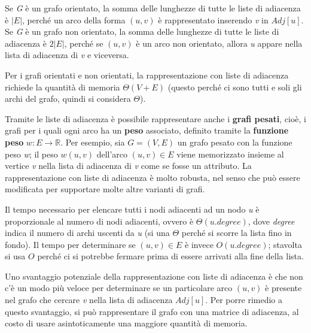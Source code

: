 \documentclass[10pt, a4paper]{report}
\begin{document}
Se \textit{G} è un grafo orientato, la somma delle lunghezze di tutte le liste di adiacenza è $|E|$, perché un arco della forma $(u,v)$ è rappresentato inserendo \textit{v} in $Adj[u]$. Se \textit{G} è un grafo non orientato, la somma delle lunghezze di tutte le liste di adiacenza è $2|E|$, perché se $(u,v)$ è un arco non orientato, allora \textit{u} appare nella lista di adiacenza di \textit{v} e viceversa.

Per i grafi orientati e non orientati, la rappresentazione con liste di adiacenza richiede la quantità di memoria $\Theta(V + E)$ (questo perché ci sono tutti e soli gli archi del grafo, quindi si considera $\Theta$).

Tramite le liste di adiacenza è possibile rappresentare anche i \textbf{grafi pesati}, cioè, i grafi per i quali ogni arco ha un \textbf{peso} associato, definito tramite la \textbf{funzione peso} $w : E \rightarrow \mathbb{R}$. Per esempio, sia $G = (V,E)$ un grafo pesato con la funzione peso \textit{w}; il peso $w(u,v)$ dell'arco $(u,v) \in E$ viene memorizzato insieme al vertice \textit{v} nella lista di adiacenza di \textit{v} come se fosse un attributo. La rappresentazione con liste di adiacenza è molto robusta, nel senso che può essere modificata per supportare molte altre varianti di grafi.

Il tempo necessario per elencare tutti i nodi adiacenti ad un nodo \textit{u} è proporzionale al numero di nodi adiacenti, ovvero è $\Theta(u.degree)$, dove \textit{degree} indica il numero di archi uscenti da \textit{u} (si una $\Theta$ perché si scorre la lista fino in fondo). Il tempo per determinare se $(u,v) \in E$ è invece $O(u.degree)$; stavolta si usa $O$ perché ci si potrebbe fermare prima di essere arrivati alla fine della lista.

Uno svantaggio potenziale della rappresentazione con liste di adiacenza è che non c'è un modo più veloce per determinare se un particolare arco $(u,v)$ è presente nel grafo che cercare \textit{v} nella lista di adiacenza $Adj[u]$. Per porre rimedio a questo svantaggio, si può rappresentare il grafo con una matrice di adiacenza, al costo di usare asintoticamente una maggiore quantità di memoria.
\end{document}
